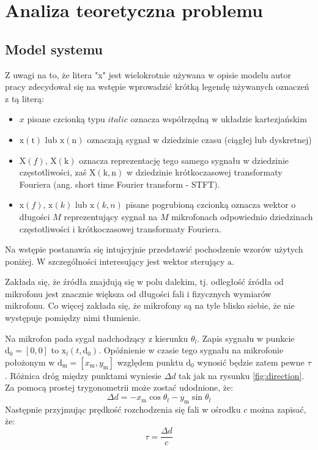 \chapter{Analiza teoretyczna problemu}
\label{chapter-2}
\section{Model systemu}

Z uwagi na to, że litera "x" jest wielokrotnie używana w opisie modelu autor pracy zdecydował się na wstępie wprowadzić krótką legendę używanych oznaczeń z tą literą:
\begin{itemize}
    \item $x$ pisane czcionką typu $italic$ oznacza współrzędną w układzie kartezjańskim
    \item $\mathrm{x(t)}$ lub $\mathrm{x(n)}$ oznaczają sygnał w dziedzinie czasu (ciągłej lub dyskretnej)
    \item $\mathrm{X}(f)$, $\mathrm{X(k)}$ oznacza reprezentację tego samego sygnału w dziedzinie częstotliwości, zaś $\mathrm{X(k,n)}$ w dziedzinie krótkoczasowej transformaty Fouriera (ang. short time Fourier transform - STFT).
    \item $\bm{\mathrm{x}}(f)$, $\bm{\mathrm{x}}(k)$ lub $\bm{\mathrm{x}}(k,n)$ pisane pogrubioną czcionką oznacza wektor o długości $M$ reprezentujący sygnał na $M$ mikrofonach odpowiednio dziedzinach częstotliwości i krótkoczasowej transformaty Fouriera.
\end{itemize}


\noindent Na wstępie postanawia się intujcyjnie przedstawić pochodzenie wzorów użytych poniżej. W szczególności interesujący jest wektor sterujący $\bm{\mathrm{a}}$.

\noindent Zakłada się, że źródła znajdują się w polu dalekim, tj. odległość źródła od mikrofonu jest znacznie większa od długości fali i fizycznych wymiarów mikrofonu. Co więcej zakłada się, że mikrofony są na tyle blisko siebie, że nie występuje pomiędzy nimi tłumienie.

\noindent Na mikrofon pada sygał nadchodzący z kierunku $\theta_{l}$.
Zapis sygnału w punkcie $\bm{\mathrm{d}}_{0} = [0,0]$ to $\mathrm{x}_{l}(t,\bm{\mathrm{d}}_{0})$. Opóźnienie w czasie tego sygnału na mikrofonie położonym w $\bm{\mathrm{d}}_{\mathrm{m}} = [x_{\mathrm{m}},y_{\mathrm{m}}]$ względem punktu $\bm{\mathrm{d}}_{0}$ wynosić będzie zatem pewne $\tau$. Różnica dróg między punktami wyniesie $\Delta d$ tak jak na rysunku \ref{fig:direction}. Za pomocą prostej trygonometrii może zostać udodnione, że:
\begin{equation}
    \label{equation:2.4}
    \Delta d = -x_{\mathrm{m}}\cos{\theta_{l}} - y_{\mathrm{m}}\sin{\theta_{l}}
\end{equation}
Następnie przyjmując prędkość rozchodzenia się fali w ośrodku $c$ można zapisać, że:
\begin{equation}
    \label{equation:2.5}
    \tau = \dfrac{\Delta d}{c}
\end{equation}

